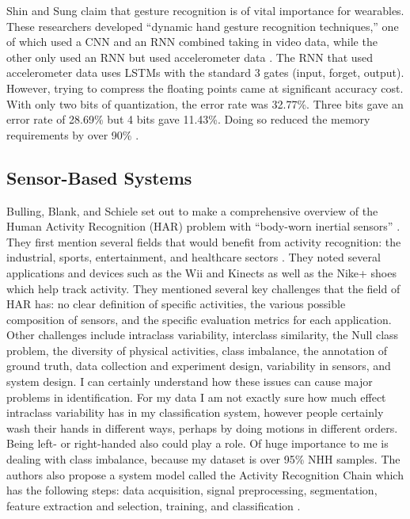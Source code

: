 \documentclass[]{report}
\begin{document}
Shin and Sung claim that gesture recognition is of vital importance for wearables. These researchers developed ``dynamic hand gesture recognition techniques,'' one of which used a CNN and an RNN combined taking in video data, while the other only used an RNN but used accelerometer data \cite{ShinS16}. The RNN that used accelerometer data uses LSTMs with the standard 3 gates (input, forget, output). However, trying to compress the floating points came at significant accuracy cost. With only two bits of quantization, the error rate was 32.77\%. Three bits gave an error rate of 28.69\% but 4 bits gave 11.43\%. Doing so reduced the memory requirements by over 90\% \cite{ShinS16}. 

\subsection{Sensor-Based Systems}

Bulling, Blank, and Schiele set out to make a comprehensive overview of the Human Activity Recognition (HAR) problem with ``body-worn inertial sensors'' \cite{Bulling}. They first mention several fields that would benefit from activity recognition: the industrial, sports, entertainment, and healthcare sectors \cite{Bulling}. They noted several applications and devices such as the Wii and Kinects as well as the Nike+ shoes which help track activity. They mentioned several key challenges that the field of HAR has: no clear definition of specific activities, the various possible composition of sensors, and the specific evaluation metrics for each application. Other challenges include intraclass variability, interclass similarity, the Null class problem, the diversity of physical activities, class imbalance, the annotation of ground truth, data collection and experiment design, variability in sensors, and system design. I can certainly understand how these issues can cause major problems in identification. For my data I am not exactly sure how much effect intraclass variability has in my classification system, however people certainly wash their hands in different ways, perhaps by doing motions in different orders. Being left- or right-handed also could play a role. Of huge importance to me is dealing with class imbalance, because my dataset is over 95\% NHH samples. The authors also propose a system model called the Activity Recognition Chain which has the following steps: data acquisition, signal preprocessing, segmentation, feature extraction and selection, training, and classification \cite{Bulling}. 
\end{document}
